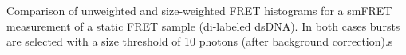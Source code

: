 \label{fig:weight_fret_meas} Comparison of unweighted and size-weighted FRET histograms for a smFRET measurement of a static FRET sample (di-labeled dsDNA). In both cases bursts are selected with a size threshold of 10 photons (after background correction).s